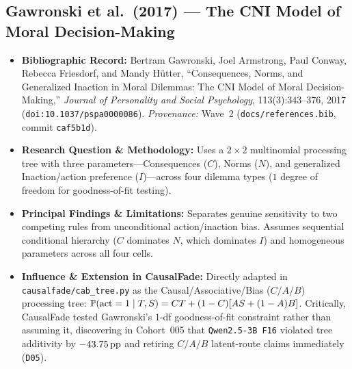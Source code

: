\subsection{Gawronski et al.\ (2017) --- The CNI Model of Moral Decision-Making \citep{gawronski2017cni}}
\begin{itemize}
  \item \textbf{Bibliographic Record:} Bertram Gawronski, Joel Armstrong, Paul Conway, Rebecca Friesdorf, and Mandy H{\"u}tter, ``Consequences, Norms, and Generalized Inaction in Moral Dilemmas: The CNI Model of Moral Decision-Making,'' \emph{Journal of Personality and Social Psychology}, 113(3):343--376, 2017 (\texttt{doi:10.1037/pspa0000086}). \emph{Provenance:} Wave~2 (\texttt{docs/references.bib}, commit \texttt{caf5b1d}).
  \item \textbf{Research Question \& Methodology:} Uses a $2\times 2$ multinomial processing tree with three parameters---Consequences ($C$), Norms ($N$), and generalized Inaction/action preference ($I$)---across four dilemma types ($1$ degree of freedom for goodness-of-fit testing).
  \item \textbf{Principal Findings \& Limitations:} Separates genuine sensitivity to two competing rules from unconditional action/inaction bias. Assumes sequential conditional hierarchy ($C$ dominates $N$, which dominates $I$) and homogeneous parameters across all four cells.
  \item \textbf{Influence \& Extension in CausalFade:} Directly adapted in \texttt{causalfade/cab\_tree.py} as the Causal/Associative/Bias ($C/A/B$) processing tree: $\mathbb{P}(\text{act}=1\mid T,S) = C T + (1-C)[A S + (1-A) B]$. Critically, CausalFade tested Gawronski's $1$-df goodness-of-fit constraint rather than assuming it, discovering in Cohort~005 that \texttt{Qwen2.5-3B F16} violated tree additivity by $-43.75\,\mathrm{pp}$ and retiring $C/A/B$ latent-route claims immediately (\texttt{D05}).
\end{itemize}

